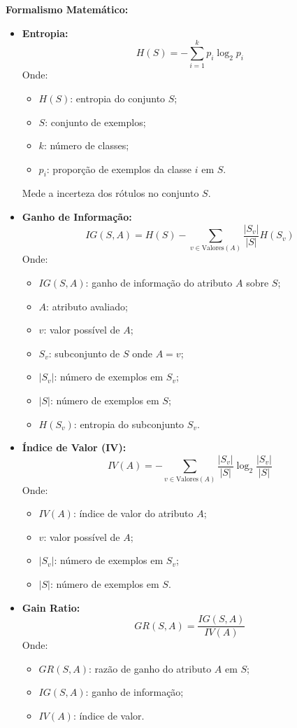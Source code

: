 \documentclass[11pt]{article}
\begin{document}
\textbf{Formalismo Matemático:}
\begin{itemize}
    \item \textbf{Entropia:}
    \[
    H(S) = -\sum_{i=1}^k p_i \log_2 p_i
    \]
    Onde:
    \begin{itemize}
        \item $H(S)$: entropia do conjunto $S$;
        \item $S$: conjunto de exemplos;
        \item $k$: número de classes;
        \item $p_i$: proporção de exemplos da classe $i$ em $S$.
    \end{itemize}
    Mede a incerteza dos rótulos no conjunto $S$.
    \item \textbf{Ganho de Informação:}
    \[
    IG(S, A) = H(S) - \sum_{v \in \text{Valores}(A)} \frac{|S_v|}{|S|} H(S_v)
    \]
    Onde:
    \begin{itemize}
        \item $IG(S, A)$: ganho de informação do atributo $A$ sobre $S$;
        \item $A$: atributo avaliado;
        \item $v$: valor possível de $A$;
        \item $S_v$: subconjunto de $S$ onde $A = v$;
        \item $|S_v|$: número de exemplos em $S_v$;
        \item $|S|$: número de exemplos em $S$;
        \item $H(S_v)$: entropia do subconjunto $S_v$.
    \end{itemize}
    \item \textbf{Índice de Valor (IV):}
    \[
    IV(A) = -\sum_{v \in \text{Valores}(A)} \frac{|S_v|}{|S|} \log_2 \frac{|S_v|}{|S|}
    \]
    Onde:
    \begin{itemize}
        \item $IV(A)$: índice de valor do atributo $A$;
        \item $v$: valor possível de $A$;
        \item $|S_v|$: número de exemplos em $S_v$;
        \item $|S|$: número de exemplos em $S$.
    \end{itemize}
    \item \textbf{Gain Ratio:}
    \[
    GR(S, A) = \frac{IG(S, A)}{IV(A)}
    \]
    Onde:
    \begin{itemize}
        \item $GR(S, A)$: razão de ganho do atributo $A$ em $S$;
        \item $IG(S, A)$: ganho de informação;
        \item $IV(A)$: índice de valor.
    \end{itemize}
\end{itemize}
\end{document}
